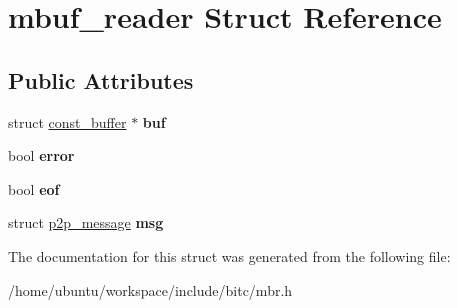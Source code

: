 \hypertarget{structmbuf__reader}{\section{mbuf\-\_\-reader Struct Reference}
\label{structmbuf__reader}
}
\subsection*{Public Attributes}
\begin{DoxyCompactItemize}
\item 
\hypertarget{structmbuf__reader_a139f95e928b06b97adf09509bd0f96c7}{struct \hyperlink{structconst__buffer}{const\-\_\-buffer} $\ast$ {\bfseries buf}}\label{structmbuf__reader_a139f95e928b06b97adf09509bd0f96c7}

\item 
\hypertarget{structmbuf__reader_a2056ca7e71519b0dcd8bf44f2e6eff69}{bool {\bfseries error}}\label{structmbuf__reader_a2056ca7e71519b0dcd8bf44f2e6eff69}

\item 
\hypertarget{structmbuf__reader_a47750845652313330ef2943b8cd2be68}{bool {\bfseries eof}}\label{structmbuf__reader_a47750845652313330ef2943b8cd2be68}

\item 
\hypertarget{structmbuf__reader_adf34f10dea9137b5ae4acdc556b99568}{struct \hyperlink{structp2p__message}{p2p\-\_\-message} {\bfseries msg}}\label{structmbuf__reader_adf34f10dea9137b5ae4acdc556b99568}

\end{DoxyCompactItemize}


The documentation for this struct was generated from the following file\-:\begin{DoxyCompactItemize}
\item 
/home/ubuntu/workspace/include/bitc/mbr.\-h\end{DoxyCompactItemize}
